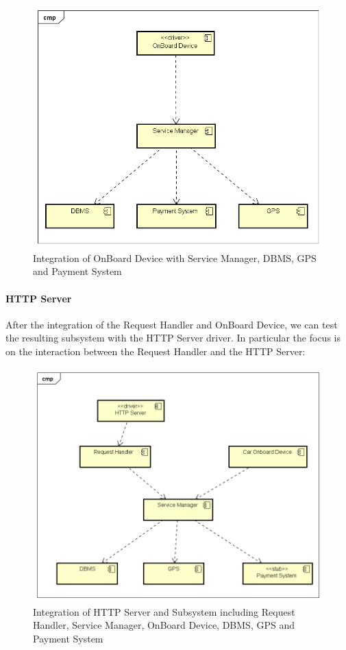 \begin{figure}[H]	
	\centering
	\includegraphics[width=\textwidth]{img/SrvMan_OnBoardDev_int}
	\caption{Integration of OnBoard Device with Service Manager, DBMS, GPS and Payment System}
\end{figure}

\paragraph{HTTP Server}
After the integration of the Request Handler and OnBoard Device, we can test the resulting subsystem with the HTTP Server driver. In particular the focus is on the interaction between the Request Handler and the HTTP Server:
\begin{figure}[H]	
	\centering
	\includegraphics[width=\textwidth]{img/ReqHan_HTTP_int}
	\caption{Integration of HTTP Server and Subsystem including Request Handler, Service Manager, OnBoard Device, DBMS, GPS and Payment System}
\end{figure}

